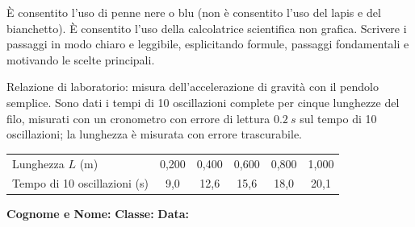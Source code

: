 \documentclass[a4paper,10pt]{exam}
\newcommand{\um}[2]{\SI[output-decimal-marker={,}]{#1}{#2}}
\begin{document}
\begin{tcolorbox}[istruzionibox]
È consentito l'uso di penne nere o blu (non è consentito l'uso del lapis e del bianchetto).
È consentito l'uso della calcolatrice scientifica non grafica.
Scrivere i passaggi in modo chiaro e leggibile, esplicitando formule, passaggi fondamentali e motivando le scelte principali.
\end{tcolorbox}

\vspace{1.5mm}


\begin{questions}
\question Relazione di laboratorio: misura dell'accelerazione di gravità con il pendolo semplice. Sono dati i tempi di 10 oscillazioni complete per cinque lunghezze del filo, misurati con un cronometro con errore di lettura $\um{0.2}{s}$ sul tempo di 10 oscillazioni; la lunghezza è misurata con errore trascurabile.
\begin{center}
\begin{tabular}{@{}lccccc@{}}\toprule
Lunghezza $L$ (\si{m}) & 0,200 & 0,400 & 0,600 & 0,800 & 1,000 \\
Tempo di 10 oscillazioni (\si{s}) & 9,0 & 12,6 & 15,6 & 18,0 & 20,1 \\\bottomrule
\end{tabular}
\end{center}
\end{questions}
\null
\vfill

\noindent
\textbf{Cognome e Nome:}\enspace\hrulefill\hspace{1cm}%
\textbf{Classe:}\enspace\makebox[2.5cm]{\hrulefill}\hspace{1cm}%
\textbf{Data:}\enspace\makebox[2.5cm]{\hrulefill}

\vspace{3mm}
\end{document}
